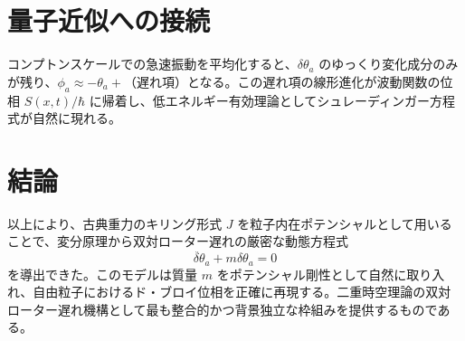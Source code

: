 \documentclass[dvipdfmx,a4paper]{article}
\begin{document}
\section{量子近似への接続}

コンプトンスケールでの急速振動を平均化すると、$\delta\theta_a$ のゆっくり変化成分のみが残り、$\phi_a \approx -\theta_a +$（遅れ項）となる。この遅れ項の線形進化が波動関数の位相 $S(x,t)/\hbar$ に帰着し、低エネルギー有効理論としてシュレーディンガー方程式が自然に現れる。

\section{結論}

以上により、古典重力のキリング形式 $J$ を粒子内在ポテンシャルとして用いることで、変分原理から双対ローター遅れの厳密な動態方程式
\[
\ddot{\delta\theta}_a + m \delta\theta_a = 0
\]
を導出できた。このモデルは質量 $m$ をポテンシャル剛性として自然に取り入れ、自由粒子におけるド・ブロイ位相を正確に再現する。二重時空理論の双対ローター遅れ機構として最も整合的かつ背景独立な枠組みを提供するものである。
\end{document}
